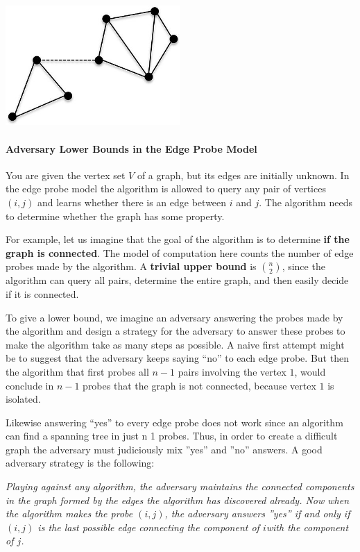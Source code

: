 \documentclass[en,hazy,blue,screen,14pt]{elegantnote}
\begin{document}
\centerline{\includegraphics[width=0.5\textwidth]{Sample-graph}}

\paragraph*{Adversary Lower Bounds in the Edge Probe Model}

You are given the vertex set $V$ of a graph, but its edges are initially
unknown. In the edge probe model the algorithm is allowed to query
any pair of vertices $(i,j)$ and learns whether there is an edge
between $i$ and $j$. The algorithm needs to determine whether the
graph has some property. 

For example, let us imagine that the goal of the algorithm is to determine
\textbf{if the graph is connected}. The model of computation here
counts the number of edge probes made by the algorithm. A \textbf{trivial
upper bound} is $\binom{n}{2}$, since the algorithm can query 
all
pairs, determine the entire graph, and then easily decide if it is
connected. 

To give a lower bound, we imagine an adversary answering the probes
made by the algorithm and design a strategy for the adversary to answer
these probes to make the algorithm take as many steps as possible.
A naive first attempt might be to suggest that the adversary keeps
saying \textquotedblleft no\textquotedblright{} to each edge probe.
But then the algorithm that first probes all $n-1$ pairs involving
the vertex $1$, would conclude in $n-1$ probes that the graph is
not connected, because vertex $1$ is isolated. 

Likewise answering ``yes\textquotedblright{} to every edge probe
does not work since an algorithm can find a spanning tree in just
n \textminus{} 1 probes. Thus, in order to create a difficult graph
the adversary must judiciously mix \textquotedblright yes\textquotedblright{}
and \textquotedblright no\textquotedblright{} answers. A good adversary
strategy is the following:

\emph{Playing against any algorithm, the adversary maintains the connected
components in the graph formed by the edges the algorithm has discovered
already. Now when the algorithm makes the probe $(i,j)$, the adversary
answers \textquotedblright yes\textquotedblright{} if and only if
$(i,j)$ is the last possible edge connecting the component of $i$with
the component of $j$. }
\end{document}
